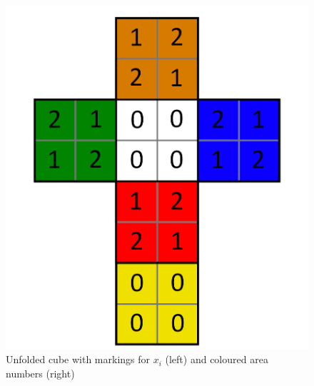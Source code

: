 \documentclass[12pt,a4paper]{article}
\theoremstyle{custom}
\begin{document}
\begin{figure}[H]
\includegraphics[scale=0.15]{foldedout_012.png}
\caption[Markings $x_i$ (left), colour area numbers (right)]{Unfolded cube with markings for $x_i$ (left) and coloured area numbers (right)}
\label{MarkingX}
\end{figure}
\end{document}
